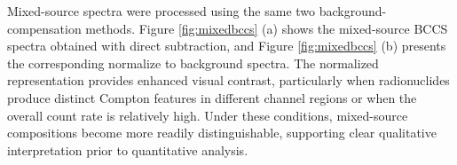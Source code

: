 \documentclass[10pt]{wlscirep}
\begin{document}







Mixed-source spectra were processed using the same two background-compensation methods. Figure \ref{fig:mixedbccs} (a) shows the mixed-source BCCS spectra obtained with direct subtraction, and Figure \ref{fig:mixedbccs} (b) presents the corresponding normalize to background spectra. The normalized representation provides enhanced visual contrast, particularly when radionuclides produce distinct Compton features in different channel regions or when the overall count rate is relatively high. Under these conditions, mixed-source compositions become more readily distinguishable, supporting clear qualitative interpretation prior to quantitative analysis.
\end{document}
